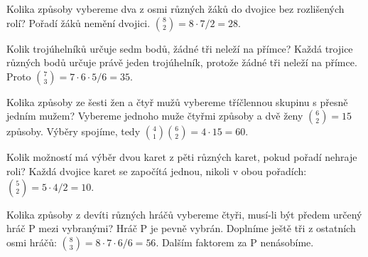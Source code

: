 \documentclass[11pt,a4paper]{article}
\begin{document}
\begin{zadaniReseniBox}[title={Úloha C1}]
Kolika způsoby vybereme dva z osmi různých žáků do dvojice bez rozlišených rolí?
\tcblower
Pořadí žáků nemění dvojici. $\binom82=8\cdot7/2=28$.
\end{zadaniReseniBox}

\begin{zadaniReseniBox}[title={Úloha C2}]
Kolik trojúhelníků určuje sedm bodů, žádné tři neleží na přímce?
\tcblower
Každá trojice různých bodů určuje právě jeden trojúhelník, protože žádné tři neleží na přímce. Proto $\binom73=7\cdot6\cdot5/6=35$.
\end{zadaniReseniBox}

\begin{zadaniReseniBox}[title={Úloha C3}]
Kolika způsoby ze šesti žen a čtyř mužů vybereme tříčlennou skupinu s přesně jedním mužem?
\tcblower
Vybereme jednoho muže čtyřmi způsoby a dvě ženy $\binom62=15$ způsoby. Výběry spojíme, tedy $\binom41\binom62=4\cdot15=60$.
\end{zadaniReseniBox}

\begin{zadaniReseniBox}[title={Úloha C4}]
Kolik možností má výběr dvou karet z pěti různých karet, pokud pořadí nehraje roli?
\tcblower
Každá dvojice karet se započítá jednou, nikoli v obou pořadích: $\binom52=5\cdot4/2=10$.
\end{zadaniReseniBox}

\begin{zadaniReseniBox}[title={Úloha C5}]
Kolika způsoby z devíti různých hráčů vybereme čtyři, musí-li být předem určený hráč P mezi vybranými?
\tcblower
Hráč P je pevně vybrán. Doplníme ještě tři z ostatních osmi hráčů: $\binom83=8\cdot7\cdot6/6=56$. Dalším faktorem za P nenásobíme.
\end{zadaniReseniBox}


\end{document}
